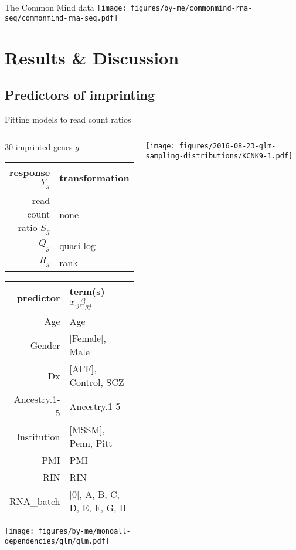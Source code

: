 \documentclass{beamer}
\newcommand{\platefigscale}[0]{0.7}
\begin{document}
\begin{frame}[label=cmc]{The Common Mind data}
\texttt{[image: figures/by-me/commonmind-rna-seq/commonmind-rna-seq.pdf]}
\end{frame}

\section{Results \& Discussion}
\subsection{Predictors of imprinting}

\begin{frame}{Fitting models to read count ratios}
\begin{columns}[t]
\begin{column}{0.45\textwidth}
\footnotesize 30 imprinted genes \(g\)
\vfill
\tiny
\begin{tabular}{|r|l|}
\hline
response \(Y_g\) & transformation \\
\hline
read count ratio \(S_g\) & none \\
\(Q_g\) & quasi-log \\
\(R_g\) & rank \\
\hline
\end{tabular}
\begin{tabular}{|r|l|}
\hline
predictor & term(s) \(x_{\cdot j} \beta_{gj}\)\\
\hline
Age & Age\\
Gender & [Female], Male\\
Dx & [AFF], Control, SCZ\\
Ancestry.1-5 & Ancestry.1-5\\
Institution & [MSSM], Penn, Pitt\\
PMI & PMI\\
RIN & RIN\\
RNA\_batch & [0], A, B, C, D, E, F, G, H\\
\hline
\end{tabular}

\texttt{[image: figures/by-me/monoall-dependencies/glm/glm.pdf]}

\end{column}
\begin{column}{0.60\textwidth}

\texttt{[image: figures/2016-08-23-glm-sampling-distributions/KCNK9-1.pdf]}
\end{column}
\end{columns}
\end{frame}
\end{document}

